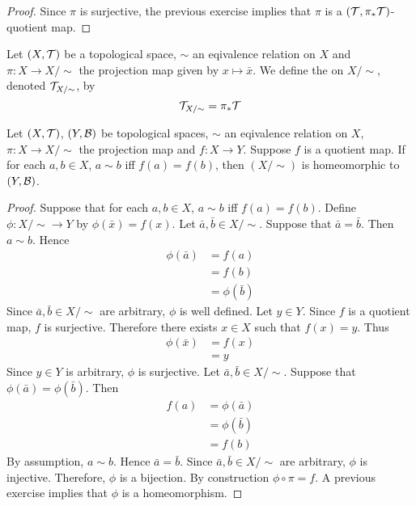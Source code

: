 \documentclass{book}
\begin{document}
	\begin{proof}
	Since $\pi$ is surjective, the previous exercise implies that $\pi$ is a $(\mathcal{T}, \pi_*\mathcal{T})$-quotient map. 
	\end{proof}

	\begin{defn} 
		Let $(X, \mathcal{T})$ be a topological space, $\sim$ an eqivalence relation on $X$ and $\pi:X \rightarrow X/\sim$ the projection map given by $x \mapsto \bar{x}$. We define the  on $X/ \sim$, denoted $\mathcal{T}_{X/ \sim}$, by $$\mathcal{T}_{X/ \sim} = \pi_{*}\mathcal{T}$$
	\end{defn}

	\begin{ex}
		Let $(X, \mathcal{T})$, $(Y, \mathcal{B})$ be topological spaces, $\sim$ an eqivalence relation on $X$, $\pi:X \rightarrow X/\sim$ the projection map and $f:X \rightarrow Y$. Suppose $f$ is a quotient map. If for each $a, b \in X$, $a \sim b$ iff $f(a) = f(b)$, then $(X/\sim)$ is homeomorphic to $(Y, \mathcal{B})$.
	\end{ex}

	\begin{proof}
		Suppose that for each $a, b \in X$, $a \sim b$ iff $f(a) = f(b)$. Define $\phi: {X / \sim } \rightarrow Y$ by $\phi(\bar{x}) = f(x)$. Let $\bar{a}, \bar{b} \in X/ \sim$. Suppose that $\bar{a} = \bar{b}$. Then $a \sim b$. Hence 
		\begin{align*}
			\phi(\bar{a})
			& = f(a) \\
			& = f(b) \\
			& = \phi(\bar{b})
		\end{align*}
		Since $\bar{a}, \bar{b} \in X/ \sim$ are arbitrary, $\phi$ is well defined. Let $y \in Y$. Since $f$ is a quotient map, $f$ is surjective. Therefore there exists $x \in X$ such that $f(x) = y$. Thus 
		\begin{align*}
			\phi(\bar{x}) 
			& = f(x) \\
			& = y 
		\end{align*}
		Since $y \in Y$ is arbitrary, $\phi$ is surjective. Let $\bar{a}, \bar{b} \in X/\sim$. Suppose that $\phi(\bar{a}) = \phi(\bar{b})$. Then 
		\begin{align*}
			f(a)
			& = \phi(\bar{a}) \\
			& = \phi(\bar{b}) \\
			& = f(b)
		\end{align*}
		By assumption, $a \sim b$. Hence $\bar{a} = \bar{b}$. Since $\bar{a}, \bar{b} \in X/\sim$ are arbitrary, $\phi$ is injective. Therefore, $\phi$ is a bijection. By construction $\phi \circ \pi = f$. A previous exercise implies that $\phi$ is a homeomorphism.
	\end{proof}
	
\end{document}
